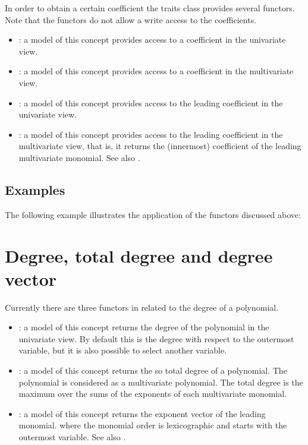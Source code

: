 In order to obtain a certain coefficient the traits class provides several functors. 
Note that the functors do not allow a write access to the coefficients. 
\begin{itemize}
\item {}: 
a model of this concept provides access to a coefficient in the univariate view. 
\item {}: 
a model of this concept provides access to a coefficient in the multivariate view.
\item {}: 
a model of this concept provides access to the leading coefficient in the univariate view. 
\item {}: 
a model of this concept provides access to the leading coefficient in the multivariate view, that is,
it returns the (innermost) coefficient of the leading multivariate monomial. 
See also  .          
\end{itemize}

\subsection{Examples}
The following example illustrates the application of the functors discussed above:


\section{Degree, total degree and degree vector}

Currently there are three functors in  related to the degree of 
a polynomial. 
\begin{itemize}
\item {}: 
a model of this concept returns the degree of the polynomial in the univariate view. 
By default this is the degree with respect to the outermost variable, 
but it is also possible to select another variable. 
\item {}: 
a model of this concept returns the so total degree of a polynomial. The polynomial
is considered as a multivariate polynomial. The total degree is the maximum over 
the sums of the exponents of each multivariate monomial. 
\item {}:
a model of this concept returns the exponent vector of the leading monomial.  where the 
monomial order is lexicographic and starts with the outermost variable. 
See also  . 
\end{itemize}

